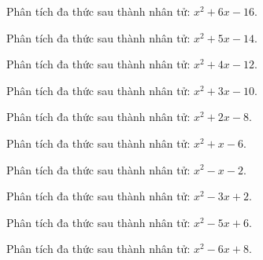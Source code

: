 \begin{bt}
	Phân tích đa thức sau thành nhân tử: $x^2 + 6 x - 16$.
\end{bt}
\begin{bt}
	Phân tích đa thức sau thành nhân tử: $x^2 + 5 x - 14$.
\end{bt}
\begin{bt}
	Phân tích đa thức sau thành nhân tử: $x^2 + 4 x - 12$.
\end{bt}
\begin{bt}
	Phân tích đa thức sau thành nhân tử: $x^2 + 3 x - 10$.
\end{bt}
\begin{bt}
	Phân tích đa thức sau thành nhân tử: $x^2 + 2 x - 8$.
\end{bt}
\begin{bt}
	Phân tích đa thức sau thành nhân tử: $x^2 + x - 6$.
\end{bt}
\begin{bt}
	Phân tích đa thức sau thành nhân tử: $x^2 - x - 2$.
\end{bt}
\begin{bt}
	Phân tích đa thức sau thành nhân tử: $x^2 - 3 x + 2$.
\end{bt}
\begin{bt}
	Phân tích đa thức sau thành nhân tử: $x^2 - 5 x + 6$.
\end{bt}
\begin{bt}
	Phân tích đa thức sau thành nhân tử: $x^2 - 6 x + 8$.
\end{bt}
